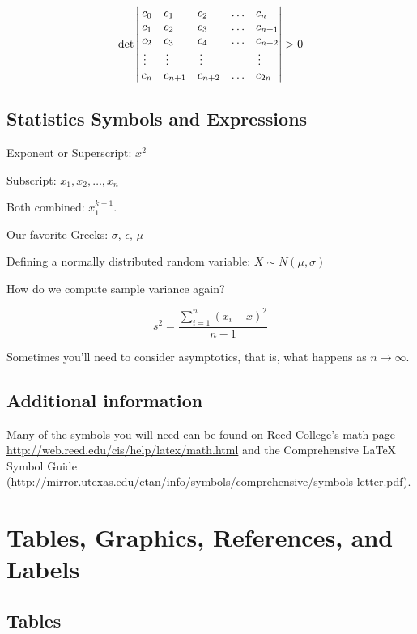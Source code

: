\documentclass[12pt, twoside]{amherstthesis}
\theoremstyle{definition}
\theoremstyle{definition}
\theoremstyle{definition}
\theoremstyle{remark}
\begin{document}
\[
\det\left|\,\begin{matrix}%
c_0&c_1\hfill&c_2\hfill&\ldots&c_n\hfill\cr
c_1&c_2\hfill&c_3\hfill&\ldots&c_{n+1}\hfill\cr
c_2&c_3\hfill&c_4\hfill&\ldots&c_{n+2}\hfill\cr
\,\vdots\hfill&\,\vdots\hfill&
  \,\vdots\hfill&&\,\vdots\hfill\cr
c_n&c_{n+1}\hfill&c_{n+2}\hfill&\ldots&c_{2n}\hfill\cr
\end{matrix}\right|>0
\]

\hypertarget{statistics-symbols-and-expressions}{%
\section{Statistics Symbols and Expressions}\label{statistics-symbols-and-expressions}}

\noindent Exponent or Superscript: \(x^2\)

\noindent Subscript: \(x_1, x_2, \dots, x_n\)

\noindent Both combined: \(x_1^{k+1}\).

\noindent Our favorite Greeks: \(\sigma\), \(\epsilon\), \(\mu\)

\noindent Defining a normally distributed random variable: \(X\sim N(\mu, \sigma)\)

How do we compute sample variance again?

\[s^2 = \frac{\sum_{i=1}^n (x_i-\bar x)^2}{n-1}\]

Sometimes you'll need to consider asymptotics, that is, what happens as \(n\rightarrow \infty\).

\hypertarget{additional-information}{%
\section{Additional information}\label{additional-information}}

Many of the symbols you will need can be found on Reed College's math page \url{http://web.reed.edu/cis/help/latex/math.html} and the Comprehensive LaTeX Symbol Guide (\url{http://mirror.utexas.edu/ctan/info/symbols/comprehensive/symbols-letter.pdf}).

\hypertarget{ref-labels}{%
\chapter{Tables, Graphics, References, and Labels}\label{ref-labels}}

\hypertarget{tables}{%
\section{Tables}\label{tables}}
\end{document}
